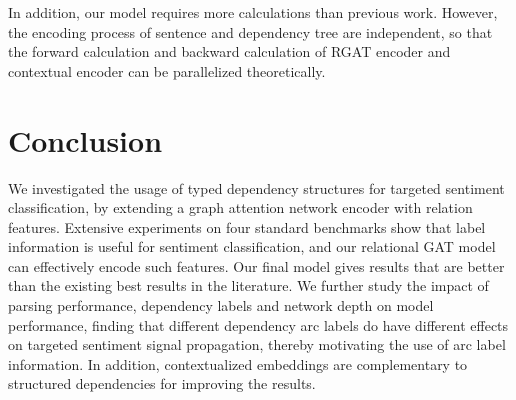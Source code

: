 \documentclass[journal]{IEEEtran}
\begin{document}
	{
	In addition, our model requires more calculations than previous work. However, the encoding process of sentence and dependency tree are independent, so that the forward calculation and backward calculation of RGAT encoder and contextual encoder can be parallelized theoretically.
	}
	
	\section{Conclusion}
We investigated the usage of typed dependency structures for targeted sentiment classification, by extending a graph attention network encoder with relation features. Extensive experiments on four standard benchmarks show that label information is useful for sentiment classification, and our relational GAT model can effectively encode such features. Our final model gives results that are better than the existing best results in the literature.
	We further study the impact of parsing performance, dependency labels and network depth on model performance, finding that different dependency arc labels do have different effects on targeted sentiment signal propagation, thereby motivating the use of arc label information. In addition, contextualized embeddings are complementary to structured dependencies for improving the results.
	
\ifCLASSOPTIONcaptionsoff
	\newpage
	\fi
	
	
	






















	
	
\end{document}
